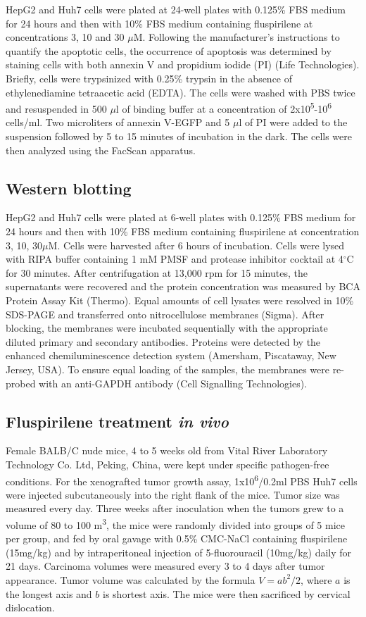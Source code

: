 \documentclass[10pt,letterpaper]{article}
\begin{document}
HepG2 and Huh7 cells were plated at 24-well plates with 0.125\% FBS medium for 24 hours and then with 10\% FBS medium containing fluspirilene at concentrations 3, 10 and 30 $\mu$M. Following the manufacturer's instructions to quantify the apoptotic cells, the occurrence of apoptosis was determined by staining cells with both annexin V and propidium iodide (PI) (Life Technologies). Briefly, cells were trypsinized with 0.25\% trypsin in the absence of ethylenediamine tetraacetic acid (EDTA). The cells were washed with PBS twice and resuspended in 500 $\mu$l of binding buffer at a concentration of 2x10\textsuperscript{5}-10\textsuperscript{6} cells/ml. Two microliters of annexin V-EGFP and 5 $\mu$l of PI were added to the suspension followed by 5 to 15 minutes of incubation in the dark. The cells were then analyzed using the FacScan apparatus.

\subsection*{Western blotting}

HepG2 and Huh7 cells were plated at 6-well plates with 0.125\% FBS medium for 24 hours and then with 10\% FBS medium containing fluspirilene at concentration 3, 10, 30$\mu$M. Cells were harvested after 6 hours of incubation. Cells were lysed with RIPA buffer containing 1 mM PMSF and protease inhibitor cocktail at 4$^\circ$C for 30 minutes. After centrifugation at 13,000 rpm for 15 minutes, the supernatants were recovered and the protein concentration was measured by BCA Protein Assay Kit (Thermo). Equal amounts of cell lysates were resolved in 10\% SDS-PAGE and transferred onto nitrocellulose membranes (Sigma). After blocking, the membranes were incubated sequentially with the appropriate diluted primary and secondary antibodies. Proteins were detected by the enhanced chemiluminescence detection system (Amersham, Piscataway, New Jersey, USA). To ensure equal loading of the samples, the membranes were re-probed with an anti-GAPDH antibody (Cell Signalling Technologies).

\subsection*{Fluspirilene treatment \textit{in vivo}}

Female BALB/C nude mice, 4 to 5 weeks old from Vital River Laboratory Technology Co. Ltd, Peking, China, were kept under specific pathogen-free conditions. For the xenografted tumor growth assay, 1x10\textsuperscript{6}/0.2ml PBS Huh7 cells were injected subcutaneously into the right flank of the mice. Tumor size was measured every day. Three weeks after inoculation when the tumors grew to a volume of 80 to 100 m\textsuperscript{3}, the mice were randomly divided into groups of 5 mice per group, and fed by oral gavage with 0.5\% CMC-NaCl containing fluspirilene (15mg/kg) and by intraperitoneal injection of 5-fluorouracil (10mg/kg) daily for 21 days. Carcinoma volumes were measured every 3 to 4 days after tumor appearance. Tumor volume was calculated by the formula $V=ab^2/2$, where $a$ is the longest axis and $b$ is shortest axis. The mice were then sacrificed by cervical dislocation.
\end{document}
